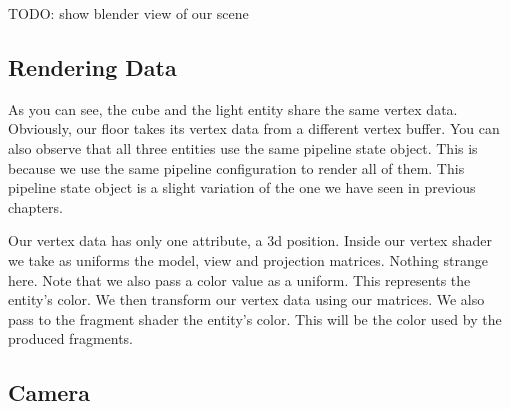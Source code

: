 \begin{minipage}{\linewidth}{\noindent}
    
\end{minipage}

\begin{minipage}{\linewidth}{\noindent}
    
\end{minipage}

TODO: show blender view of our scene

\subsection{Rendering Data}

As you can see, the cube and the light entity share the same vertex data.
Obviously, our floor takes its vertex data from a different vertex buffer.
You can also observe that all three entities use the same pipeline state object.
This is because we use the same pipeline configuration to render all of them.
This pipeline state object is a slight variation of the one we have seen in
previous chapters.

\begin{minipage}{\linewidth}{\noindent}
    
\end{minipage}

\begin{minipage}{\linewidth}{\noindent}
    
\end{minipage}

Our vertex data has only one attribute, a 3d position.
Inside our vertex shader we take as uniforms the model,
view and projection matrices.
Nothing strange here.
Note that we also pass a color value as a uniform.
This represents the entity's color.
We then transform our vertex data using our matrices.
We also pass to the fragment shader the entity's color.
This will be the color used by the produced fragments.

\subsection{Camera}

